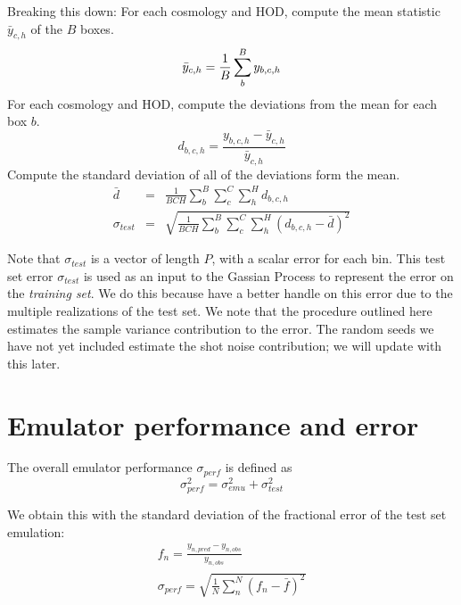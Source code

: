 \documentclass[12pt]{article}
\begin{document}
Breaking this down: For each cosmology and HOD, compute the mean statistic $\bar{y}_{c,h}$ of the $B$ boxes.
\begin{equation}
    \bar{y}_{c,h} = \frac{1}{B} \sum_b^B {y_{b,c,h}} \\
\end{equation}
For each cosmology and HOD, compute the deviations from the mean for each box $b$.
\begin{equation}
    d_{b,c,h} = \frac{ {y_{b,c,h} - \bar{y}_{c,h}} } {\bar{y}_{c,h}}
\end{equation}
Compute the standard deviation of all of the deviations form the mean.
\begin{eqnarray}
    \bar{d} &=& \frac{1}{BCH} \sum_b^B \sum_{c}^C \sum_{h}^H d_{b,c,h} \\
    \sigma_{test} &=& \sqrt{ \frac{1}{BCH} \sum_{b}^B \sum_{c}^C \sum_{h}^H (d_{b,c,h} - \bar{d})^2 }
\end{eqnarray}

Note that $\sigma_{test}$ is a vector of length $P$, with a scalar error for each bin. 
This test set error $\sigma_{test}$ is used as an input to the Gassian Process to represent the error on the \emph{training set}. 
We do this because have a better handle on this error due to the multiple realizations of the test set.
We note that the procedure outlined here estimates the sample variance contribution to the error.
The random seeds we have not yet included estimate the shot noise contribution; we will update with this later.


\section{Emulator performance and error}

The overall emulator performance $\sigma_{perf}$ is defined as
\begin{equation}
    \sigma_{perf}^2 = \sigma_{emu}^2 + \sigma_{test}^2
\end{equation}

We obtain this with the standard deviation of the fractional error of the test set emulation:
\begin{eqnarray}
    f_n = \frac{ y_{n,pred} - y_{n,obs} } {y_{n,obs}} \\
    \sigma_{perf} = \sqrt{ \frac{1}{N} \sum_n^N (f_n - \bar{f})^2 }
\end{eqnarray}
\end{document}
